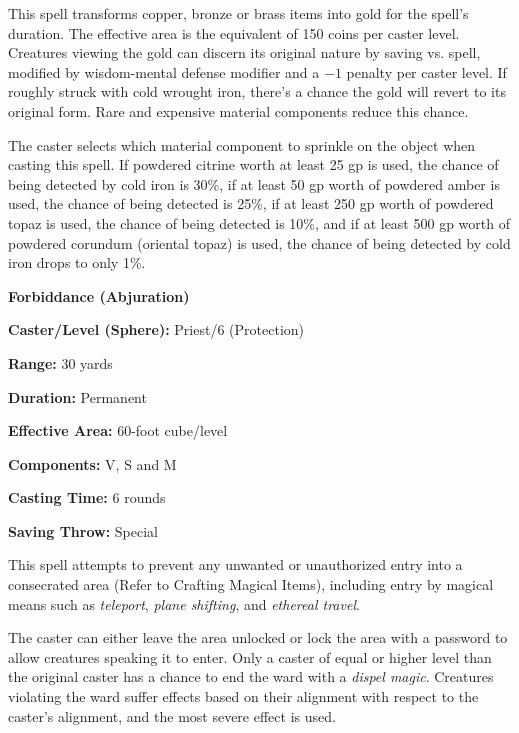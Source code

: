 \begin{multicols}{2}
\begin{minipage}{\columnwidth}
\end{minipage}

This spell transforms copper, bronze or brass items into gold for the spell's duration. The effective area is the equivalent of 150 coins per caster level.  Creatures viewing the gold can discern its original nature by saving vs. spell, modified by wisdom-mental defense modifier and a $-1$ penalty per caster level.  If roughly struck with cold wrought iron, there's a chance the gold will revert to its original form.  Rare and expensive material components reduce this chance.

The caster selects which material component to sprinkle on the object when casting this spell.  If powdered citrine worth at least 25 gp is used, the chance of being detected by cold iron is 30\%, if at least 50 gp worth of powdered amber is used, the chance of being detected is 25\%, if at least 250 gp worth of powdered topaz is used, the chance of being detected is 10\%, and if at least 500 gp worth of powdered corundum (oriental topaz) is used, the chance of being detected by cold iron drops to only 1\%.

\vspace{1em}

\noindent
\begin{minipage}{\columnwidth}

\noindent \textbf{Forbiddance (Abjuration)}

\noindent \textbf{Caster/Level (Sphere):} Priest/6 (Protection)

\noindent \textbf{Range:} 30 yards

\noindent \textbf{Duration:} Permanent

\noindent \textbf{Effective Area:} 60-foot cube/level

\noindent \textbf{Components:} V, S and M

\noindent \textbf{Casting Time:} 6 rounds

\noindent \textbf{Saving Throw:} Special

\end{minipage}

This spell attempts to prevent any unwanted or unauthorized entry into a consecrated area (Refer to Crafting Magical Items), including entry by magical means such as \textit{teleport}, \textit{plane shifting}, and \textit{ethereal travel}.  

The caster can either leave the area unlocked or lock the area with a password to allow creatures speaking it to enter.  Only a caster of equal or higher level than the original caster has a chance to end the ward with a \textit{dispel magic}.  Creatures violating the ward suffer effects based on their alignment with respect to the caster's alignment, and the most severe effect is used.


\end{multicols}
